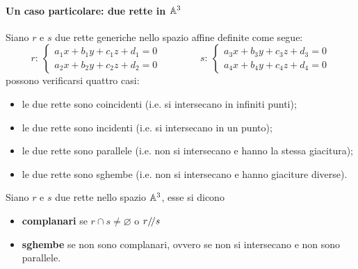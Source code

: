 \documentclass{article}     %
\begin{document}
\paragraph{Un caso particolare: due rette in $\mathbb{A}^3$}
Siano $r$ e $s$ due rette generiche nello spazio affine definite come segue:
\[r:\ \begin{cases}
    a_1x+b_1y+c_1z+d_1=0\\
    a_2x+b_2y+c_2z+d_2=0
\end{cases}\qquad \qquad s:\ \begin{cases}
    a_3x+b_3y+c_3z+d_3=0\\
    a_4x+b_4y+c_4z+d_4=0
\end{cases}\]
possono verificarsi quattro casi:
\begin{itemize}
    \item le due rette sono coincidenti (i.e. si intersecano in infiniti punti);
    \item le due rette sono incidenti (i.e. si intersecano in un punto);
    \item le due rette sono parallele (i.e. non si intersecano e hanno la stessa giacitura);
    \item le due rette sono sghembe (i.e. non si intersecano e hanno giaciture diverse).
\end{itemize}
\begin{boxdef}
    Siano $r$ e $s$ due rette nello spazio $\mathbb{A}^3$, esse si dicono
    \begin{itemize}
        \item \textbf{complanari} se $r\cap s\neq \varnothing$ o $r{/\!/} s$
        \item \textbf{sghembe} se non sono complanari, ovvero se non si intersecano e non sono parallele.
    \end{itemize}
\end{boxdef}
\end{document}
